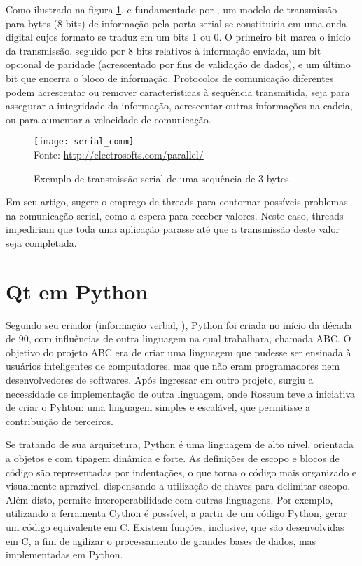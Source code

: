 Como ilustrado na figura \ref{img_serial_comm}, e fundamentado por , um modelo de transmissão para bytes (8 bits) de informação pela porta serial se constituiria em uma onda digital cujos formato se traduz em um bits 1 ou 0. O primeiro bit marca o início da transmissão, seguido por 8 bits relativos à informação enviada, um bit opcional de paridade (acrescentado por fins de validação de dados), e um último bit que encerra o bloco de informação. Protocolos de comunicação diferentes podem acrescentar ou remover características à sequência transmitida, seja para assegurar a integridade da informação, acrescentar outras informações na cadeia, ou para aumentar a velocidade de comunicação.

\begin{figure}[hbt]
	\centering
	\caption{Exemplo de transmissão serial de uma sequência de 3 bytes}
	\texttt{[image: serial\_comm]} \\
	Fonte: \href{http://electrosofts.com/parallel/}{http://electrosofts.com/parallel/}
	\label{img_serial_comm}
\end{figure}

Em seu artigo,  sugere o emprego de threads para contornar possíveis problemas na comunicação serial, como a espera para receber valores. Neste caso, threads impediriam que toda uma aplicação parasse até que a transmissão deste valor seja completada. 

\section{Qt em Python}

Segundo seu criador (informação verbal, \cite{Rossum2003}), Python foi criada no início da década de 90, com influências de outra linguagem na qual trabalhara, chamada ABC. O objetivo do projeto ABC era de criar uma linguagem que pudesse ser ensinada à usuários inteligentes de computadores, mas que não eram programadores nem desenvolvedores de softwares. Após ingressar em outro projeto, surgiu a necessidade de implementação de outra linguagem, onde Rossum teve a iniciativa de criar o Pyhton: uma  linguagem simples e escalável, que permitisse a contribuição de terceiros.

Se tratando de sua arquitetura, Python é uma linguagem de alto nível, orientada a objetos e com tipagem dinâmica e forte. As definições de escopo e blocos de código são representadas por indentações, o que torna o código mais organizado e visualmente aprazível, dispensando a utilização de chaves para delimitar escopo. Além disto, permite interoperabilidade com outras linguagens. Por exemplo, utilizando a ferramenta Cython é possível, a partir de um código Python, gerar um código equivalente em C. Existem funções, inclusive, que são desenvolvidas em C, a fim de agilizar o processamento de grandes bases de dados, mas implementadas em Python.

